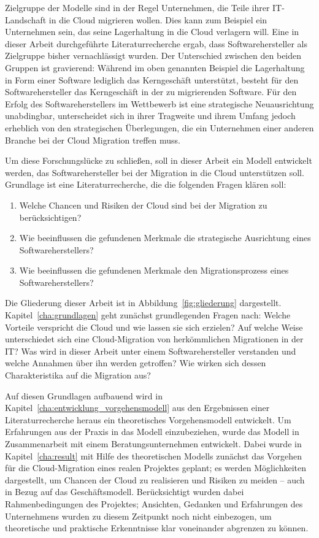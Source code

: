 Zielgruppe der Modelle sind in der Regel Unternehmen, die Teile ihrer
IT-Landschaft in die Cloud migrieren wollen. Dies kann zum Beispiel ein
Unternehmen sein, das
seine Lagerhaltung in die Cloud verlagern will. Eine in
dieser Arbeit durchgeführte Literaturrecherche ergab,
dass Softwarehersteller als Zielgruppe bisher vernachlässigt wurden. Der
Unterschied zwischen den beiden Gruppen ist gravierend: Während im oben
genannten Beispiel die
Lagerhaltung in Form einer Software lediglich das Kerngeschäft unterstützt,
besteht für den Softwarehersteller das Kerngeschäft in der zu migrierenden
Software. Für den Erfolg des Softwareherstellers im Wettbewerb ist eine strategische
Neuausrichtung
unabdingbar, unterscheidet sich in ihrer Tragweite und ihrem Umfang jedoch
erheblich von den strategischen Überlegungen, die ein Unternehmen einer anderen
Branche bei der Cloud Migration treffen muss.

Um diese Forschungslücke zu schließen, soll in dieser Arbeit ein Modell entwickelt werden, das
Softwarehersteller bei der Migration in die Cloud unterstützen soll. Grundlage
ist eine Literaturrecherche, die die folgenden Fragen klären soll:
\begin{enumerate}
	\item Welche Chancen und Risiken der Cloud sind bei der
Migration zu berücksichtigen?
	\item Wie beeinflussen die gefundenen Merkmale die strategische
Ausrichtung eines Softwareherstellers?
	\item Wie beeinflussen die gefundenen Merkmale den Migrationsprozess
eines Softwareherstellers?
\end{enumerate}

Die Gliederung dieser Arbeit ist in Abbildung~\ref{fig:gliederung} dargestellt.
Kapitel~\ref{cha:grundlagen} geht zunächst grundlegenden Fragen nach:
Welche Vorteile verspricht die Cloud und wie lassen sie sich erzielen? Auf
welche Weise unterschiedet sich eine Cloud-Migration von herkömmlichen
Migrationen in der IT? Was wird in dieser Arbeit unter einem Softwarehersteller
verstanden und welche Annahmen über ihn werden getroffen? Wie wirken sich dessen
Charakteristika auf die Migration aus?

Auf diesen Grundlagen aufbauend wird in Kapitel~\ref{cha:entwicklung_vorgehensmodell} aus den Ergebnissen einer Literaturrecherche heraus ein theoretisches Vorgehensmodell entwickelt. Um Erfahrungen aus der Praxis in das Modell einzubeziehen, wurde das Modell in
Zusammenarbeit mit einem Beratungsunternehmen entwickelt. Dabei wurde in Kapitel~\ref{cha:result} mit Hilfe des theoretischen Modells zunächst das Vorgehen für die Cloud-Migration eines realen Projektes geplant; es werden Möglichkeiten dargestellt, um Chancen der Cloud zu realisieren und Risiken zu meiden -- auch in Bezug auf das Geschäftsmodell. Berücksichtigt wurden dabei Rahmenbedingungen des Projektes; Ansichten, Gedanken und Erfahrungen des Unternehmens wurden zu diesem Zeitpunkt noch nicht einbezogen, um theoretische und praktische Erkenntnisse klar voneinander abgrenzen zu können.

